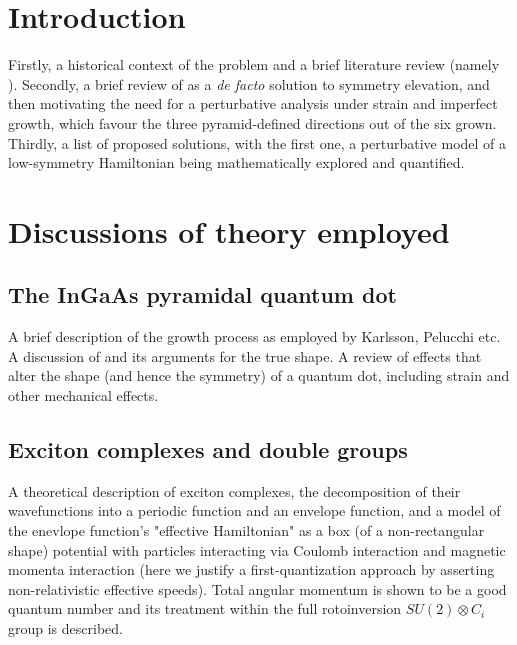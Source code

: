 \documentclass[12pt]{article}
\begin{document}


\section{Introduction}

Firstly, a historical context of the problem and a brief literature review (namely \cite{karlsson}). Secondly, a brief review of \cite{hexagon} as a \textit{de facto} solution to symmetry elevation, and then motivating the need for a perturbative analysis under strain and imperfect growth, which favour the three pyramid-defined directions out of the six grown. Thirdly, a list of proposed solutions, with the first one, a perturbative model of a low-symmetry Hamiltonian being mathematically explored and quantified.

\section{Discussions of theory employed}

\subsection{The InGaAs pyramidal quantum dot} \label{sec:growth}
A brief description of the growth process as employed by Karlsson, Pelucchi etc. A discussion of \cite{hexagon} and its arguments for the true shape. A review of effects that alter the shape (and hence the symmetry) of a quantum dot, including strain and other mechanical effects.

\subsection{Exciton complexes and double groups}
A theoretical description of exciton complexes, the decomposition of their wavefunctions into a periodic function and an envelope function, and a model of the enevlope function's "effective Hamiltonian" as a box (of a non-rectangular shape) potential with particles interacting via Coulomb interaction and magnetic momenta interaction (here we justify a first-quantization approach by asserting non-relativistic effective speeds). Total angular momentum is shown to be a good quantum number and its treatment within the full rotoinversion $SU(2)\otimes C_i$ group is described.
\end{document}
